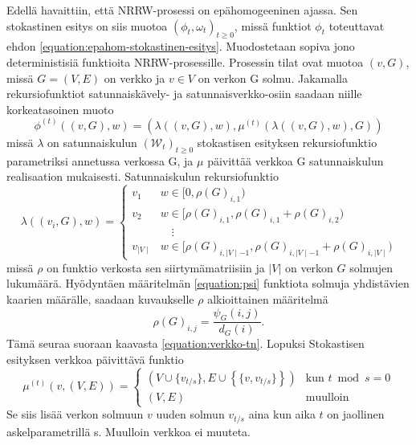 \documentclass[finnish, 12pt, a4paper, sci, utf8, pdfa]{aaltothesis}
\newcommand{\Wrandom}{\mathcal{W}}
\begin{document}
Edellä havaittiin, että NRRW-prosessi on epähomogeeninen ajassa. Sen stokastinen esitys on siis muotoa \( (\phi_{t}, \omega_{t})_{t \geq 0} \), missä funktiot \( \phi_{t} \) toteuttavat ehdon \ref{equation:epahom-stokastinen-esitys}. Muodostetaan sopiva jono deterministisiä funktioita NRRW-prosessille. Prosessin tilat ovat muotoa \( (v, G) \), missä \( G = (V, E) \) on verkko ja \( v \in V \) on verkon G solmu. Jakamalla rekursiofunktiot satunnaiskävely- ja satunnaisverkko-osiin saadaan niille korkeatasoinen muoto
\begin{equation}
   \phi^{(t)} \left( (v, G), w \right) = \left( \lambda\left( (v, G), w \right), \mu^{(t)} \left( \lambda\left( (v, G), w \right), G \right) \right)
   \label{equation:esitys-1}
\end{equation}
missä \( \lambda \) on satunnaiskulun \( (\Wrandom_{t})_{t \geq 0} \) stokastisen esityksen rekursiofunktio parametriksi annetussa verkossa G, ja \( \mu \) päivittää verkkoa G satunnaiskulun realisaation mukaisesti. Satunnaiskulun rekursiofunktio
\begin{equation}
   \lambda \left( (v_{i}, G), w \right) = 
   \begin{cases}
      v_{1} & w \in [0, \rho(G)_{i,1}) \\
      v_{2} & w \in [\rho(G)_{i,1}, \rho(G)_{i,1} + \rho(G)_{i,2}) \\
            & \quad \vdots \\
      v_{\mid V \mid} & w \in [\rho(G)_{i,\mid V \mid - 1}, \rho(G)_{i,\mid V \mid - 1} + \rho(G)_{i,\mid V \mid}) 
   \end{cases}
\end{equation}
missä \( \rho \) on funktio verkosta sen siirtymämatriisiin ja $ |V| $ on verkon $ G $ solmujen lukumäärä. Hyödyntäen määritelmän \ref{equation:psi} funktiota solmuja yhdistävien kaarien määrälle, saadaan kuvaukselle \( \rho \) alkioittainen määritelmä
\begin{equation}
   \rho(G)_{i,j} = \frac{\psi_{G}(i, j)}{d_{G}(i)}.
\end{equation}
Tämä seuraa suoraan kaavasta \ref{equation:verkko-tn}. Lopuksi Stokastisen esityksen verkkoa päivittävä funktio
\begin{equation}
   \mu^{(t)} \left( v, (V, E) \right) =
   \begin{cases}
      \left( V \cup \{v_{t/s}\}, E \cup \left\{ \{ v, v_{t/s} \} \right\} \right) & \text{kun } t \bmod s = 0 \\
      \left( V, E \right) & \text{muulloin}
   \end{cases}
   \label{equation:esitys-4}
\end{equation}
Se siis lisää verkon solmuun \( v \) uuden solmun \( v_{t/s} \) aina kun aika $ t $ on jaollinen askelparametrillä s. Muulloin verkkoa ei muuteta.
\end{document}

